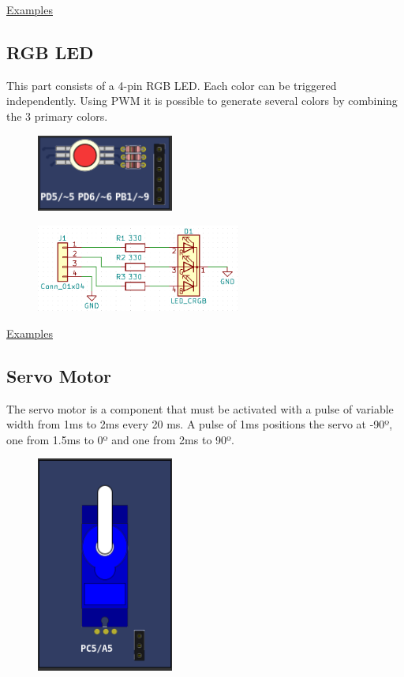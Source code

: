 \href{https://lcgamboa.github.io/picsimlab_examples/Parts.html\#LEDs}{Examples}
 
\subsection{RGB LED}

This part consists of a 4-pin RGB LED. Each color can be triggered independently.
Using PWM it is possible to generate several colors by combining the 3 primary colors. 
\begin{figure}[H]
\center
\includegraphics[width=0.4\textwidth]{img/part_rgb.png} 
\end{figure} 

\begin{figure}[H]
\center
\includegraphics[width=0.6\textwidth]{img/part_rgb_.png} 
\end{figure} 

\href{https://lcgamboa.github.io/picsimlab_examples/Parts.html\#RGB_LED}{Examples}

\subsection{Servo Motor}

The servo motor is a component that must be activated with a pulse of variable width from 1ms to 2ms every 20 ms.
A pulse of 1ms positions the servo at -90º, one from 1.5ms to 0º and one from 2ms to 90º.

\begin{figure}[H]
\center
\includegraphics[width=0.4\textwidth]{img/part_servo.png} 
\end{figure} 

